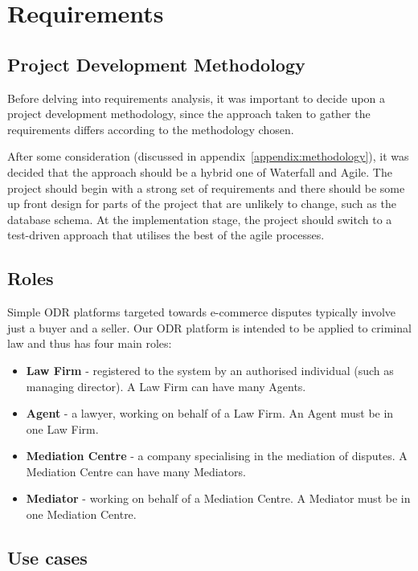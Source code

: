 \chapter{Requirements}\label{chapter:requirements}

\section{Project Development Methodology}

Before delving into requirements analysis, it was important to decide upon a project development methodology, since the approach taken to gather the requirements differs according to the methodology chosen.

After some consideration (discussed in appendix~\ref{appendix:methodology}), it was decided that the approach should be a hybrid one of Waterfall and Agile. The project should begin with a strong set of requirements and there should be some up front design for parts of the project that are unlikely to change, such as the database schema. At the implementation stage, the project should switch to a test-driven approach that utilises the best of the agile processes.

\section{Roles}

Simple ODR platforms targeted towards e-commerce disputes typically involve just a buyer and a seller. Our ODR platform is intended to be applied to criminal law and thus has four main roles:

\begin{itemize}
\item \textbf{Law Firm} - registered to the system by an authorised individual (such as managing director). A Law Firm can have many Agents.
\item \textbf{Agent} - a lawyer, working on behalf of a Law Firm. An Agent must be in one Law Firm.
\item \textbf{Mediation Centre} - a company specialising in the mediation of disputes. A Mediation Centre can have many Mediators.
\item \textbf{Mediator} - working on behalf of a Mediation Centre. A Mediator must be in one Mediation Centre.
\end{itemize}

\section{Use cases}

